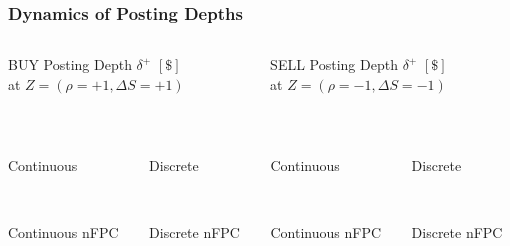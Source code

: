 \begin{frame}
\frametitle{Dynamics of Posting Depths}
\begin{columns}[T] %
\begin{column}{.48\textwidth}
BUY Posting Depth $\delta^+$ $[\$]$\\
at $Z=(\rho = +1, \Delta S = +1)$
\end{column}%
\hfill%
\begin{column}{.48\textwidth}
SELL Posting Depth $\delta^+$ $[\$]$\\
at $Z=(\rho = -1, \Delta S = -1)$
\end{column}%
\end{columns}
\vspace{\baselineskip}
\begin{columns}[T] %
\begin{column}{.24\textwidth}
\centering%
\\
{\scriptsize Continuous \par}
\\
{\scriptsize Continuous nFPC \par}
\end{column}%
\begin{column}{.24\textwidth}
\centering%
\\
{\scriptsize Discrete \par}
\\
{\scriptsize Discrete nFPC \par}
\end{column}%
\hfill%
\vrule{}
\hfill%
\begin{column}{.24\textwidth}
\centering%
\\
{\scriptsize Continuous \par}
\\
{\scriptsize Continuous nFPC \par}
\end{column}%
\begin{column}{.24\textwidth}
\centering%
\\
{\scriptsize Discrete \par}
\\
{\scriptsize Discrete nFPC \par}
\end{column}%
\end{columns}
\vspace{\baselineskip}
\centering
{}
\end{frame}

